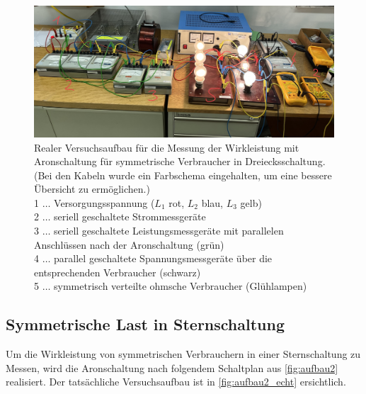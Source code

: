 \documentclass[12pt,english,ngerman]{scrartcl}
\begin{document}
\begin{figure}[H]
	\begin{center}
		\includegraphics[width = \textwidth]{./figures/aufbau1_echt.png}
	\end{center}
	\caption[Realer Versuchsaufbau für die Messung der Wirkleistung mit Aronschaltung für
		symmetrische Verbraucher in Dreiecksschaltung] {Realer Versuchsaufbau für die
		Messung der Wirkleistung mit Aronschaltung für symmetrische Verbraucher in
		Dreiecksschaltung. (Bei den Kabeln wurde ein Farbschema eingehalten, um eine
		bessere Übersicht zu ermöglichen.)                                  \\
		1 \(\dots\) Versorgungsspannung ($L_1$ rot, $L_2$ blau, $L_3$ gelb) \\
		2 \(\dots\) seriell geschaltete Strommessgeräte                     \\
		3 \(\dots\) seriell geschaltete Leistungsmessgeräte mit parallelen Anschlüssen
		nach der Aronschaltung (grün)                                       \\
		4 \(\dots\) parallel geschaltete Spannungsmessgeräte über die entsprechenden
		Verbraucher (schwarz)                                               \\
		5 \(\dots\) symmetrisch verteilte ohmsche Verbraucher (Glühlampen)
	}
	\label{fig:aufbau1_echt}
\end{figure}

\subsection{Symmetrische Last in Sternschaltung}

Um die Wirkleistung von symmetrischen Verbrauchern in einer Sternschaltung zu
Messen, wird die Aronschaltung nach folgendem Schaltplan aus
\autoref{fig:aufbau2} realisiert. Der tatsächliche Versuchsaufbau ist in
\autoref{fig:aufbau2_echt} ersichtlich.
\end{document}
